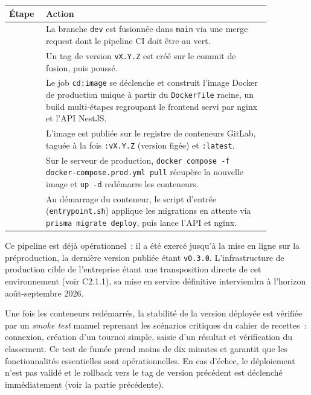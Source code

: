 \begin{table}[H]
    \centering
    \small
    \renewcommand{\arraystretch}{1.35}
    \begin{tabular}{|>{\centering\arraybackslash}p{0.10\linewidth}|>{\raggedright\arraybackslash}p{0.76\linewidth}|}
        \hline
        \textbf{Étape} & \textbf{Action} \\
        \hline
        1 & La branche \texttt{dev} est fusionnée dans \texttt{main} via une merge request dont le pipeline CI doit être au vert. \\
        \hline
        2 & Un tag de version \texttt{vX.Y.Z} est créé sur le commit de fusion, puis poussé. \\
        \hline
        3 & Le job \texttt{cd:image} se déclenche et construit l'image Docker de production unique à partir du \texttt{Dockerfile} racine, un build multi-étapes regroupant le frontend servi par nginx et l'API NestJS. \\
        \hline
        4 & L'image est publiée sur le registre de conteneurs GitLab, taguée à la fois \texttt{:vX.Y.Z} (version figée) et \texttt{:latest}. \\
        \hline
        5 & Sur le serveur de production, \texttt{docker compose -f docker-compose.prod.yml pull} récupère la nouvelle image et \texttt{up -d} redémarre les conteneurs. \\
        \hline
        6 & Au démarrage du conteneur, le script d'entrée (\texttt{entrypoint.sh}) applique les migrations en attente via \texttt{prisma migrate deploy}, puis lance l'API et nginx. \\
        \hline
    \end{tabular}
\end{table}

Ce pipeline est déjà opérationnel~: il a été exercé jusqu'à la mise en ligne sur la préproduction, la dernière version publiée étant \texttt{v0.3.0}. L'infrastructure de production cible de l'entreprise étant une transposition directe de cet environnement (voir C2.1.1), sa mise en service définitive interviendra à l'horizon août-septembre 2026.

Une fois les conteneurs redémarrés, la stabilité de la version déployée est vérifiée par un \emph{smoke test} manuel reprenant les scénarios critiques du cahier de recettes~: connexion, création d'un tournoi simple, saisie d'un résultat et vérification du classement. Ce test de fumée prend moins de dix minutes et garantit que les fonctionnalités essentielles sont opérationnelles. En cas d'échec, le déploiement n'est pas validé et le rollback vers le tag de version précédent est déclenché immédiatement (voir la partie précédente).

